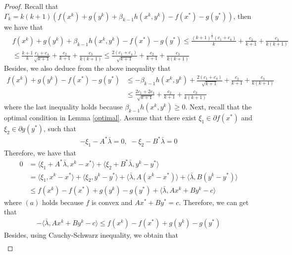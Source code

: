 \documentclass{article}
\numberwithin{equation}{section}
\begin{document}
\begin{proof}
    Recall that $\Gamma_k = k(k+1)\left(f(x^k)+ g(y^k)+ \beta_{k-1}h(x^k,y^k) -f(x^*)-g(y^*)\right)$, then we have that
    \begin{align}
        &f(x^k) +g(y^k)+\beta_{k-1}h(x^k,y^k) -f(x^*)-g(y^*) \leq \frac{(k+1)^{\frac{1}{2}}(c_1+c_4)}{k} + \frac{c_2}{k+1}+\frac{c_3}{k(k+1)}  \nonumber\\
        & \leq \frac{k+1}{k}\frac{c_1+ c_4}{\sqrt{k+1}} +\frac{c_2}{k+1} +\frac{c_3}{k(k+1)} 
        \leq \frac{2(c_1 + c_4)}{\sqrt{k+1}} +\frac{c_2}{k+1} +\frac{c_3}{k(k+1)} \label{Fk-F*_leq}
    \end{align}
    Besides, we also deduce from the above inequality that 
    \begin{align}
        f(x^k) +g(y^k) -f(x^*)-g(y^*) &\leq -\beta_{k-1}h(x^k,y^k)+
        \frac{2(c_1+ c_4)}{\sqrt{k+1}} +\frac{c_2}{k+1}+ \frac{c_3}{k(k+1)} \nonumber \\
        &\leq \frac{2c_1+2c_4}{\sqrt{k+1}} +\frac{c_2}{k+1}+ \frac{c_3}{k(k+1)} \label{Fk-F*_leq_one_size}
    \end{align} 
    where the last inequality holds because $\beta_{k-1}h(x^k,y^k) \geq 0$. 
    Next, recall that the optimal condition in Lemma \ref{optimal}. Assume that there exist $\xi_1 \in \partial f(x^*)$ and $\xi_2 \in \partial g(y^*)$, such that 
    \begin{align}
        -\xi_1 -A^*\bar{\lambda} =0, \hspace{4pt}
        -\xi_2-B^*\bar{\lambda} =0
    \end{align}
    Therefore, we have that
    \begin{align}
        0&= \langle \xi_1+A^*\bar{\lambda}, x^k -x^*\rangle+ \langle \xi_2+B^*\bar{\lambda}, y^k-y^*\rangle \nonumber \\
        & =\langle \xi_1, x^k -x^* \rangle +\langle \xi_2, y^k -y^*\rangle +\langle \bar{\lambda}, A(x^k-x^*) \rangle +\langle \bar{\lambda}, B(y^k-y^*) \rangle \nonumber \\
        &\overset{\mathop{(a)}}{\leq} f(x^k) -f(x^*) + g(y^k) -g(y^*) + \langle \bar{\lambda}, Ax^k+By^k-c\rangle
    \end{align}
    where $(a)$ holds because $f$ is convex 
    and $Ax^* + By^* = c$. 
    Therefore, we can get that
    \begin{align}
        -\langle \bar{\lambda}, Ax^k+By^k-c\rangle \leq f(x^k) -f(x^*) + g(y^k) -g(y^*) \label{F-F^*}
    \end{align}
   Besides, using Cauchy-Schwarz inequality, we obtain that
    \begin{align}

\end{align}
\end{proof}
\end{document}
